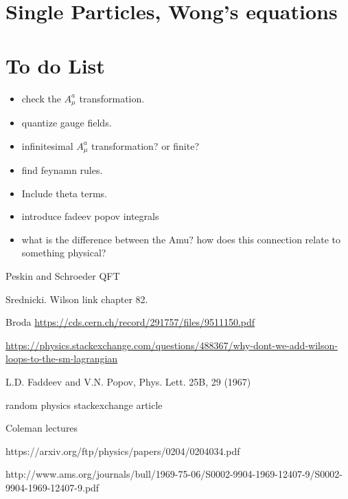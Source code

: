 \documentclass[main.tex]{subfiles}
\begin{document}
\section{Single Particles, Wong's equations}
\section{To do List}
\begin{itemize}
\item check the $A_\mu^a$ transformation.
\item quantize gauge fields.
\item infinitesimal $A_\mu^a$ transformation? or finite?
\item find feynamn rules.
\item Include theta terms.
\item introduce fadeev popov integrals
\item what is the difference between the Amu? how does this connection relate to something physical?
\end{itemize}

\begin{thebibliography}{9}
Peskin and Schroeder QFT

Srednicki. Wilson link chapter 82.

Broda \url{https://cds.cern.ch/record/291757/files/9511150.pdf}

\url{https://physics.stackexchange.com/questions/488367/why-dont-we-add-wilson-loops-to-the-sm-lagrangian}

L.D. Faddeev and V.N. Popov, Phys. Lett. 25B, 29 (1967)

random physics stackexchange article

Coleman lectures

https://arxiv.org/ftp/physics/papers/0204/0204034.pdf

http://www.ams.org/journals/bull/1969-75-06/S0002-9904-1969-12407-9/S0002-9904-1969-12407-9.pdf
\end{thebibliography}
\end{document}

